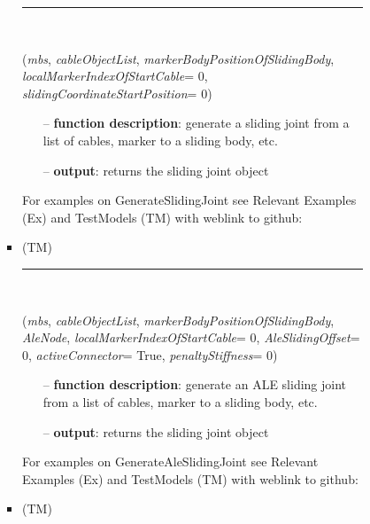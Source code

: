\begin{itemize}[leftmargin=1.4cm]
\begin{itemize}[leftmargin=1.4cm]
\begin{itemize}[leftmargin=1.4cm]
\begin{itemize}[leftmargin=0.5cm]
\begin{itemize}[leftmargin=1.4cm]
%
\noindent\rule{8cm}{0.75pt}\vspace{1pt} \\ 
\begin{flushleft}
\label{sec:beams:GenerateSlidingJoint}
({\it mbs}, {\it cableObjectList}, {\it markerBodyPositionOfSlidingBody}, {\it localMarkerIndexOfStartCable}= 0, {\it slidingCoordinateStartPosition}= 0)
\end{flushleft}
\setlength{\itemindent}{0.7cm}
\begin{itemize}[leftmargin=0.7cm]
\item[--]
{\bf function description}: generate a sliding joint from a list of cables, marker to a sliding body, etc.
\item[--]
{\bf output}: returns the sliding joint object
\vspace{12pt}\end{itemize}
%
%
\noindent For examples on GenerateSlidingJoint see Relevant Examples (Ex) and TestModels (TM) with weblink to github:
\bi
 \item \footnotesize {} (TM)
\ei

%
\noindent\rule{8cm}{0.75pt}\vspace{1pt} \\ 
\begin{flushleft}
\label{sec:beams:GenerateAleSlidingJoint}
({\it mbs}, {\it cableObjectList}, {\it markerBodyPositionOfSlidingBody}, {\it AleNode}, {\it localMarkerIndexOfStartCable}= 0, {\it AleSlidingOffset}= 0, {\it activeConnector}= True, {\it penaltyStiffness}= 0)
\end{flushleft}
\setlength{\itemindent}{0.7cm}
\begin{itemize}[leftmargin=0.7cm]
\item[--]
{\bf function description}: generate an ALE sliding joint from a list of cables, marker to a sliding body, etc.
\item[--]
{\bf output}: returns the sliding joint object
\vspace{12pt}\end{itemize}
%
%
\noindent For examples on GenerateAleSlidingJoint see Relevant Examples (Ex) and TestModels (TM) with weblink to github:
\bi
 \item \footnotesize {} (TM)
\ei


\end{itemize}
\end{itemize}
\end{itemize}
\end{itemize}
\end{itemize}
